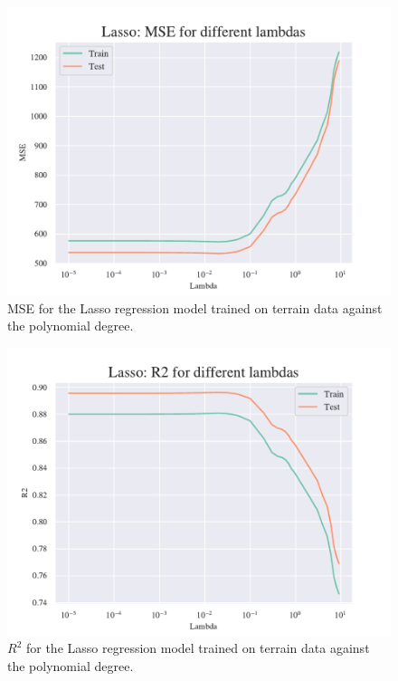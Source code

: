 \begin{figure}[H]
    \centering
    \includegraphics[width=1\linewidth]{project_1/figures/figures_in_appendix/Lasso_MSE_terrain.pdf}
    \caption{MSE for the Lasso regression model trained on terrain data against the polynomial degree.}
    \label{fig:ref13}
\end{figure}

\begin{figure}[H]
    \centering
    \includegraphics[width=1\linewidth]{project_1/figures/figures_in_appendix/Lasso_R2_terrain.pdf}
    \caption{$R^2$ for the Lasso regression model trained on terrain data against the polynomial degree.}
    \label{fig:ref14}
\end{figure}


